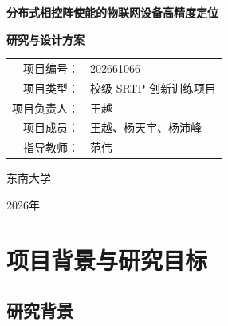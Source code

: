 \documentclass[UTF8,a4paper,12pt]{ctexart}
\begin{document}
\begin{titlepage}
  \centering
  \vspace*{2.2cm}
  {\bfseries 分布式相控阵使能的物联网设备高精度定位\par}
  \vspace{1.1cm}
  {\bfseries 研究与设计方案\par}
  \vfill
  \renewcommand{\arraystretch}{1.6}
  \begin{tabular}{rl}
    项目编号：& 202661066\\
    项目类型：& 校级 SRTP 创新训练项目\\
    项目负责人：& 王越\\
    项目成员：& 王越、杨天宇、杨沛峰\\
    指导教师：& 范伟\\
  \end{tabular}
  \vfill
  {东南大学\par}
  \vspace{0.5cm}
  {2026年\par}
\end{titlepage}

\tableofcontents
\clearpage
{}

\begin{abstract}
本项目面向室内物联网终端定位，研究以多个分布式相控阵阵位为基础、以幅度或功率观测代替逐通道直接相位测量的定位方案。系统通过受控改变阵元相位，利用旋转电场矢量法（REV）从阵列合成功率变化中恢复阵元相对复响应；随后使用多重信号分类（MUSIC）和常规波束形成估计每个阵位的信号到达方向，并结合阵位坐标完成多阵位联合定位。研究采用分层验证路线：MATLAB用于验证算法模型和参数影响，FEKO用于引入天线、材料和电磁传播因素，Wireless InSite用于补充室内传播仿真，实物实验用于检验测量、复响应恢复、测向和定位的完整链路。本文给出系统组成、算法模型以及各验证阶段的实际设计，不包含后续实验结果。

\noindent\textbf{关键词：}分布式相控阵；功率测量；REV；DOA；AOA定位；MUSIC；常规波束形成
\end{abstract}

\section{项目背景与研究目标}

\subsection{研究背景}
\end{document}
